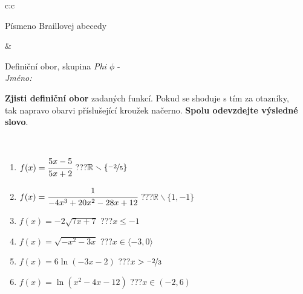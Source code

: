 \documentclass[10pt]{report}
\begin{document}
\begin{tabular}{c:c}
\begin{minipage}[c][104.5mm][t]{0.5\linewidth}
\begin{center}
\begin{minipage}{0.20\linewidth}
\begin{center}
{\small Písmeno Braillovej abecedy}
\end{center}
\end{minipage}
\end{center}
\end{minipage}
&
\begin{minipage}[c][104.5mm][t]{0.5\linewidth}
\begin{center}
\vspace{7mm}
{\huge Definiční obor, skupina \textit{Phi $\phi$} -}\\[5mm]
\textit{Jméno:}\phantom{xxxxxxxxxxxxxxxxxxxxxxxxxxxxxxxxxxxxxxxxxxxxxxxxxxxxxxxxxxxxxxxxx}\\[5mm]
\begin{minipage}{0.95\linewidth}
\begin{center}
\textbf{Zjisti definiční obor} zadaných funkcí. Pokud se shoduje s tím za otazníky,\\tak napravo obarvi příslušející kroužek načerno. \textbf{Spolu odevzdejte výsledné slovo}.
\end{center}
\end{minipage}
\\[1mm]
\begin{minipage}{0.79\linewidth}
\begin{center}
\begin{varwidth}{\linewidth}
\begin{enumerate}
\normalsizerrr
\item $f(x)=\cfrac{5x-5}{5x+2}$\quad \dotfill\; ???\;\dotfill \quad $\mathbb{R}\smallsetminus\{\nicefrac{-2}{5}\}$
\item $f(x)=\cfrac{1}{-4x^3+20x^2-28x+12}$\quad \dotfill\; ???\;\dotfill \quad $\mathbb{R}\smallsetminus\{1,-1\}$
\item $f(x)=-2\sqrt{7x+7}$\quad \dotfill\; ???\;\dotfill \quad $x\leq-1$
\item $f(x)=\sqrt{-x^2-3x}$\quad \dotfill\; ???\;\dotfill \quad $x\in\langle-3 , 0\rangle$
\item $f(x)=6\ln{(-3x-2)}$\quad \dotfill\; ???\;\dotfill \quad $x>\nicefrac{-2}{3}$
\item $f(x)=\ln{(x^2-4x-12)}$\quad \dotfill\; ???\;\dotfill \quad $x\in(-2 , 6)$
\end{enumerate}
\end{varwidth}
\end{center}
\end{minipage}
\begin{minipage}{0.20\linewidth}
\begin{center}

\end{center}
\end{minipage}
\end{center}
\end{minipage}
\end{tabular}
\end{document}
